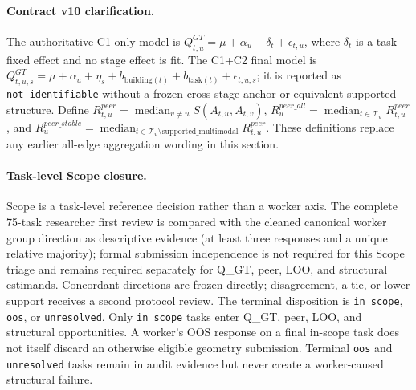 \paragraph{Contract v10 clarification.}
The authoritative C1-only model is \(Q^{GT}_{t,u}=\mu+\alpha_u+\delta_t+\epsilon_{t,u}\), where \(\delta_t\) is a task fixed effect and no stage effect is fit. The C1+C2 final model is \(Q^{GT}_{t,u,s}=\mu+\alpha_u+\eta_s+b_{\mathrm{building}(t)}+b_{\mathrm{task}(t)}+\epsilon_{t,u,s}\); it is reported as \texttt{not\_identifiable} without a frozen cross-stage anchor or equivalent supported structure. Define \(R^{peer}_{t,u}=\operatorname{median}_{v\ne u}S(A_{t,u},A_{t,v})\), \(R^{peer\_all}_u=\operatorname{median}_{t\in\mathcal T_u}R^{peer}_{t,u}\), and \(R^{peer\_stable}_u=\operatorname{median}_{t\in\mathcal T_u\setminus\mathrm{supported\_multimodal}}R^{peer}_{t,u}\). These definitions replace any earlier all-edge aggregation wording in this section.

\paragraph{Task-level Scope closure.}
Scope is a task-level reference decision rather than a worker axis. The complete 75-task researcher first review is compared with the cleaned canonical worker group direction as descriptive evidence (at least three responses and a unique relative majority); formal submission independence is not required for this Scope triage and remains required separately for Q\_GT, peer, LOO, and structural estimands. Concordant directions are frozen directly; disagreement, a tie, or lower support receives a second protocol review. The terminal disposition is \texttt{in\_scope}, \texttt{oos}, or \texttt{unresolved}. Only \texttt{in\_scope} tasks enter Q\_GT, peer, LOO, and structural opportunities. A worker's OOS response on a final in-scope task does not itself discard an otherwise eligible geometry submission. Terminal \texttt{oos} and \texttt{unresolved} tasks remain in audit evidence but never create a worker-caused structural failure.
